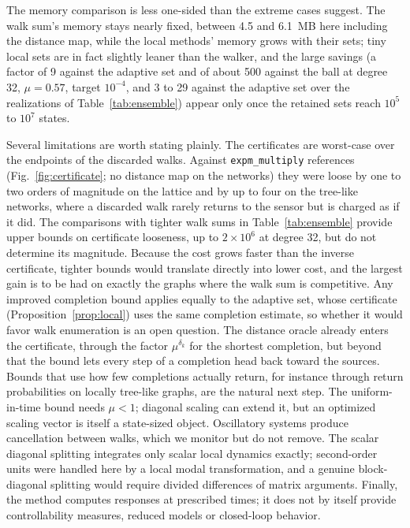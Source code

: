 \documentclass[aps,pra,superscriptaddress,floatfix,longbibliography,twocolumn]{revtex4-2}
\begin{document}
The memory comparison is less one-sided than the extreme cases suggest. The walk sum's memory stays nearly fixed, between 4.5 and 6.1~MB here including the distance map, while the local methods' memory grows with their sets; tiny local sets are in fact slightly leaner than the walker, and the large savings (a factor of 9 against the adaptive set and of about 500 against the ball at degree 32, $\mu=0.57$, target $10^{-4}$, and 3 to 29 against the adaptive set over the realizations of Table~\ref{tab:ensemble}) appear only once the retained sets reach $10^5$ to $10^7$ states.

Several limitations are worth stating plainly. The certificates are worst-case over the endpoints of the discarded walks. Against \texttt{expm\_multiply} references (Fig.~\ref{fig:certificate}; no distance map on the networks) they were loose by one to two orders of magnitude on the lattice and by up to four on the tree-like networks, where a discarded walk rarely returns to the sensor but is charged as if it did. The comparisons with tighter walk sums in Table~\ref{tab:ensemble} provide upper bounds on certificate looseness, up to $2\times10^6$ at degree 32, but do not determine its magnitude. Because the cost grows faster than the inverse certificate, tighter bounds would translate directly into lower cost, and the largest gain is to be had on exactly the graphs where the walk sum is competitive. Any improved completion bound applies equally to the adaptive set, whose certificate (Proposition~\ref{prop:local}) uses the same completion estimate, so whether it would favor walk enumeration is an open question. The distance oracle already enters the certificate, through the factor $\mu^{\delta_k}$ for the shortest completion, but beyond that the bound lets every step of a completion head back toward the sources. Bounds that use how few completions actually return, for instance through return probabilities on locally tree-like graphs, are the natural next step. The uniform-in-time bound needs $\mu<1$; diagonal scaling can extend it, but an optimized scaling vector is itself a state-sized object. Oscillatory systems produce cancellation between walks, which we monitor but do not remove. The scalar diagonal splitting integrates only scalar local dynamics exactly; second-order units were handled here by a local modal transformation, and a genuine block-diagonal splitting would require divided differences of matrix arguments. Finally, the method computes responses at prescribed times; it does not by itself provide controllability measures, reduced models or closed-loop behavior.
\end{document}
